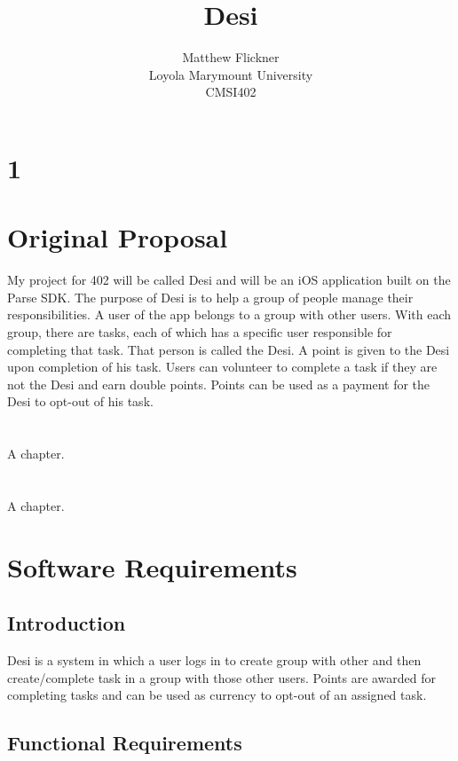 \documentclass[11pt, a4paper]{report}
\title{Desi}
\author{Matthew Flickner \\ Loyola Marymount University\\ CMSI402}
\providecommand\phantomsection{}
\begin{document}
\clearpage
\phantomsection
{}
\maketitle


\tableofcontents
\newpage
 
\chapter{1}

\chapter{Original Proposal}
My project for 402 will be called Desi and will be an iOS application built on the Parse SDK. The purpose of Desi is to help a group of people manage their responsibilities. A user of the app belongs to a group with other users. With each group, there are tasks, each of which has a specific user responsible for completing that task. That person is called the Desi. A point is given to the Desi upon completion of his task. Users can volunteer to complete a task if they are not the Desi and earn double points. Points can be used as a payment for the Desi to opt-out of his task.

\chapter{}
 A chapter.

\chapter{}
 A chapter.

\chapter{Software Requirements}

\section{Introduction}
Desi is a system in which a user logs in to create group with other and then create/complete task in a group with those other users. Points are awarded for completing tasks and can be used as currency to opt-out of an assigned task.

\section{Functional Requirements}
\end{document}
